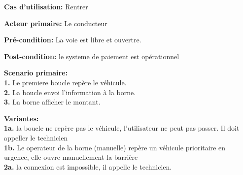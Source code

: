 \textbf{Cas d'utilisation: }Rentrer

\textbf{Acteur primaire:} Le conducteur


\textbf{Pré-condition: } La voie est libre et ouvertre.
 
\textbf{Post-condition: } le systeme de paiement est opérationnel


\textbf{Scenario primaire: } \\
    \textbf{1.} Le premiere boucle repère le véhicule.\\
    \textbf{2.} La boucle envoi l’information à la borne.\\
    \textbf{3.} La borne afficher le montant.

\textbf{Variantes:}\\
    \textbf{1a.} la boucle ne repère pas le véhicule, l’utilisateur ne peut pas passer. Il doit appeller le technicien\\
    \textbf{1b.} Le operateur de la borne (manuelle) repère un véhicule prioritaire en urgence, elle ouvre manuellement la barrière\\
    \textbf{2a.}  la connexion est impossible, il appelle le technicien. \\
    

